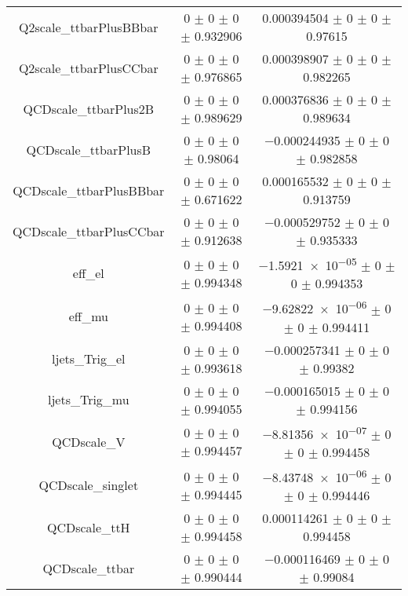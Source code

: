 \begin{table}
\begin{tabular}{ccc}
Q2scale\_ttbarPlusBBbar & \num{0} $\pm$ \num{0} $\pm$ \num{0} $\pm$ \num{0.932906} & \num{0.000394504} $\pm$ \num{0} $\pm$ \num{0} $\pm$ \num{0.97615}\\
Q2scale\_ttbarPlusCCbar & \num{0} $\pm$ \num{0} $\pm$ \num{0} $\pm$ \num{0.976865} & \num{0.000398907} $\pm$ \num{0} $\pm$ \num{0} $\pm$ \num{0.982265}\\
QCDscale\_ttbarPlus2B & \num{0} $\pm$ \num{0} $\pm$ \num{0} $\pm$ \num{0.989629} & \num{0.000376836} $\pm$ \num{0} $\pm$ \num{0} $\pm$ \num{0.989634}\\
QCDscale\_ttbarPlusB & \num{0} $\pm$ \num{0} $\pm$ \num{0} $\pm$ \num{0.98064} & \num{-0.000244935} $\pm$ \num{0} $\pm$ \num{0} $\pm$ \num{0.982858}\\
QCDscale\_ttbarPlusBBbar & \num{0} $\pm$ \num{0} $\pm$ \num{0} $\pm$ \num{0.671622} & \num{0.000165532} $\pm$ \num{0} $\pm$ \num{0} $\pm$ \num{0.913759}\\
QCDscale\_ttbarPlusCCbar & \num{0} $\pm$ \num{0} $\pm$ \num{0} $\pm$ \num{0.912638} & \num{-0.000529752} $\pm$ \num{0} $\pm$ \num{0} $\pm$ \num{0.935333}\\
eff\_el & \num{0} $\pm$ \num{0} $\pm$ \num{0} $\pm$ \num{0.994348} & \num{-1.5921e-05} $\pm$ \num{0} $\pm$ \num{0} $\pm$ \num{0.994353}\\
eff\_mu & \num{0} $\pm$ \num{0} $\pm$ \num{0} $\pm$ \num{0.994408} & \num{-9.62822e-06} $\pm$ \num{0} $\pm$ \num{0} $\pm$ \num{0.994411}\\
ljets\_Trig\_el & \num{0} $\pm$ \num{0} $\pm$ \num{0} $\pm$ \num{0.993618} & \num{-0.000257341} $\pm$ \num{0} $\pm$ \num{0} $\pm$ \num{0.99382}\\
ljets\_Trig\_mu & \num{0} $\pm$ \num{0} $\pm$ \num{0} $\pm$ \num{0.994055} & \num{-0.000165015} $\pm$ \num{0} $\pm$ \num{0} $\pm$ \num{0.994156}\\
QCDscale\_V & \num{0} $\pm$ \num{0} $\pm$ \num{0} $\pm$ \num{0.994457} & \num{-8.81356e-07} $\pm$ \num{0} $\pm$ \num{0} $\pm$ \num{0.994458}\\
QCDscale\_singlet & \num{0} $\pm$ \num{0} $\pm$ \num{0} $\pm$ \num{0.994445} & \num{-8.43748e-06} $\pm$ \num{0} $\pm$ \num{0} $\pm$ \num{0.994446}\\
QCDscale\_ttH & \num{0} $\pm$ \num{0} $\pm$ \num{0} $\pm$ \num{0.994458} & \num{0.000114261} $\pm$ \num{0} $\pm$ \num{0} $\pm$ \num{0.994458}\\
QCDscale\_ttbar & \num{0} $\pm$ \num{0} $\pm$ \num{0} $\pm$ \num{0.990444} & \num{-0.000116469} $\pm$ \num{0} $\pm$ \num{0} $\pm$ \num{0.99084}\\

\end{tabular}
\end{table}
